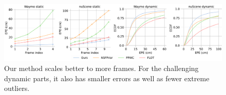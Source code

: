 \begin{figure}[t!]
    \centering
    \includegraphics[width=1.0\columnwidth]{figs/figure/figure_1.pdf}
    \caption{Our method scales better to more frames. For the challenging dynamic parts, it also has smaller errors as well as fewer extreme outliers.}
    \label{fig:epe3d_ecdf}
\end{figure}